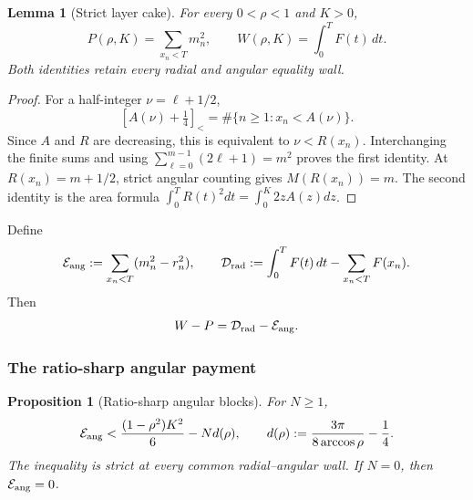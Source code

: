 \documentclass[11pt]{article}
\newtheorem{proposition}[theorem]{Proposition}
\newtheorem{lemma}[theorem]{Lemma}
\theoremstyle{remark}
\begin{document}
\begin{lemma}[Strict layer cake]
\label{rs:lem:layer-cake}
For every $0<\rho<1$ and $K>0$,
\begin{equation}
 P(\rho,K)=\sum_{x_n<T}m_n^2,
 \qquad
 W(\rho,K)=\int_0^T F(t)\,dt.
 \label{rs:eq:layer-cake}
\end{equation}
Both identities retain every radial and angular equality wall.
\end{lemma}

\begin{proof}
For a half-integer $\nu=\ell+1/2$,
\[
 [A(\nu)+\tfrac14]_<
 =\#\{n\geq1:x_n<A(\nu)\}.
\]
Since $A$ and $R$ are decreasing, this is equivalent to
$\nu<R(x_n)$.  Interchanging the finite sums and using
$\sum_{\ell=0}^{m-1}(2\ell+1)=m^2$ proves the first identity.  At
$R(x_n)=m+1/2$, strict angular counting gives $M(R(x_n))=m$.
The second identity is the area formula
$\int_0^TR(t)^2dt=\int_0^K2zA(z)dz$.
\end{proof}

Define
\begin{equation}
 \mathcal E_{\rm ang}:=\sum_{x_n<T}(m_n^2-r_n^2),
 \qquad
 \mathcal D_{\rm rad}:=\int_0^TF(t)\,dt-\sum_{x_n<T}F(x_n).
 \label{rs:eq:defects}
\end{equation}
Then
\begin{equation}
 W-P=\mathcal D_{\rm rad}-\mathcal E_{\rm ang}.
 \label{rs:eq:master-defect}
\end{equation}

\subsubsection*{The ratio-sharp angular payment}

\begin{proposition}[Ratio-sharp angular blocks]
\label{rs:prop:angular}
For $N\geq1$,
\begin{equation}
 \mathcal E_{\rm ang}
 <\frac{(1-\rho^2)K^2}{6}-N d(\rho),
 \qquad
 d(\rho):=\frac{3\pi}{8\arccos\rho}-\frac14.
 \label{rs:eq:angular-sharp}
\end{equation}
The inequality is strict at every common radial--angular wall.  If $N=0$,
then $\mathcal E_{\rm ang}=0$.
\end{proposition}
\end{document}
